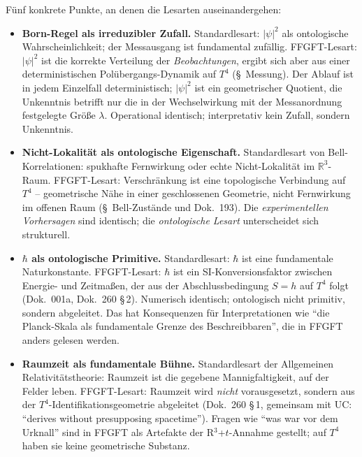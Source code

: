 F\"unf konkrete Punkte, an denen die Lesarten auseinandergehen:

\begin{itemize}[leftmargin=2em,itemsep=4pt,topsep=4pt]
  \item \textbf{Born-Regel als irreduzibler Zufall.}
        Standardlesart: $|\psi|^2$ als ontologische
        Wahrscheinlichkeit; der Messausgang ist fundamental
        zuf\"allig. FFGFT-Lesart: $|\psi|^2$ ist die korrekte
        Verteilung der \emph{Beobachtungen}, ergibt sich aber aus
        einer deterministischen Polübergangs-Dynamik auf $T^4$
        (§~Messung). Der Ablauf ist in jedem Einzelfall
        deterministisch; $|\psi|^2$ ist ein geometrischer Quotient,
        die Unkenntnis betrifft nur die in der Wechselwirkung mit der
        Messanordnung festgelegte Größe $\lambda$. Operational
        identisch; interpretativ kein Zufall, sondern Unkenntnis.

  \item \textbf{Nicht-Lokalit\"at als ontologische Eigenschaft.}
        Standardlesart von Bell-Korrelationen: spukhafte Fernwirkung
        oder echte Nicht-Lokalit\"at im $\mathbb{R}^3$-Raum.
        FFGFT-Lesart: Verschr\"ankung ist eine topologische Verbindung
        auf $T^4$ -- geometrische N\"ahe in einer geschlossenen
        Geometrie, nicht Fernwirkung im offenen Raum (§~Bell-Zust\"ande
        und Dok.~193). Die
        \emph{experimentellen Vorhersagen} sind identisch; die
        \emph{ontologische Lesart} unterscheidet sich strukturell.

  \item \textbf{$\hbar$ als ontologische Primitive.}
        Standardlesart: $\hbar$ ist eine fundamentale Naturkonstante.
        FFGFT-Lesart: $\hbar$ ist ein SI-Konversionsfaktor zwischen
        Energie- und Zeitma\ss en, der aus der Abschlussbedingung
        $S=h$ auf $T^4$ folgt (Dok.~001a, Dok.~260 §\,2). Numerisch
        identisch; ontologisch nicht primitiv, sondern abgeleitet. Das
        hat Konsequenzen f\"ur Interpretationen wie \enquote{die
        Planck-Skala als fundamentale Grenze des Beschreibbaren}, die
        in FFGFT anders gelesen werden.

  \item \textbf{Raumzeit als fundamentale B\"uhne.}
        Standardlesart der Allgemeinen Relativit\"atstheorie:
        Raumzeit ist die gegebene Mannigfaltigkeit, auf der Felder
        leben. FFGFT-Lesart: Raumzeit wird \emph{nicht} vorausgesetzt,
        sondern aus der $T^4$-Identifikationsgeometrie abgeleitet
        (Dok.~260 §\,1, gemeinsam mit UC: \enquote{derives without
        presupposing spacetime}). Fragen wie \enquote{was war vor dem
        Urknall} sind in FFGFT als Artefakte der R$^3$+$t$-Annahme
        gestellt; auf $T^4$ haben sie keine geometrische Substanz.


\end{itemize}
